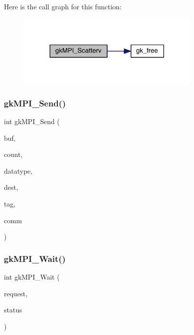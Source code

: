 Here is the call graph for this function\+:\nopagebreak
\begin{figure}[H]
\begin{center}
\leavevmode
\includegraphics[width=254pt]{a00951_a08990d66eed081828d6addc2e5affde3_cgraph}
\end{center}
\end{figure}
\mbox{\label{a00951_a2442b8eee4afc113918cd7a5878244b6}} 
\subsubsection{\texorpdfstring{gk\+M\+P\+I\+\_\+\+Send()}{gkMPI\_Send()}}
{\footnotesize\ttfamily int gk\+M\+P\+I\+\_\+\+Send (\begin{DoxyParamCaption}\item[{void $\ast$}]{buf,  }\item[{\hyperlink{a00876_aaa5262be3e700770163401acb0150f52}{idx\+\_\+t}}]{count,  }\item[{M\+P\+I\+\_\+\+Datatype}]{datatype,  }\item[{\hyperlink{a00876_aaa5262be3e700770163401acb0150f52}{idx\+\_\+t}}]{dest,  }\item[{\hyperlink{a00876_aaa5262be3e700770163401acb0150f52}{idx\+\_\+t}}]{tag,  }\item[{M\+P\+I\+\_\+\+Comm}]{comm }\end{DoxyParamCaption})}

\mbox{\label{a00951_a878d900addb2e537070c9892cc37dde0}} 
\subsubsection{\texorpdfstring{gk\+M\+P\+I\+\_\+\+Wait()}{gkMPI\_Wait()}}
{\footnotesize\ttfamily int gk\+M\+P\+I\+\_\+\+Wait (\begin{DoxyParamCaption}\item[{M\+P\+I\+\_\+\+Request $\ast$}]{request,  }\item[{M\+P\+I\+\_\+\+Status $\ast$}]{status }\end{DoxyParamCaption})}

